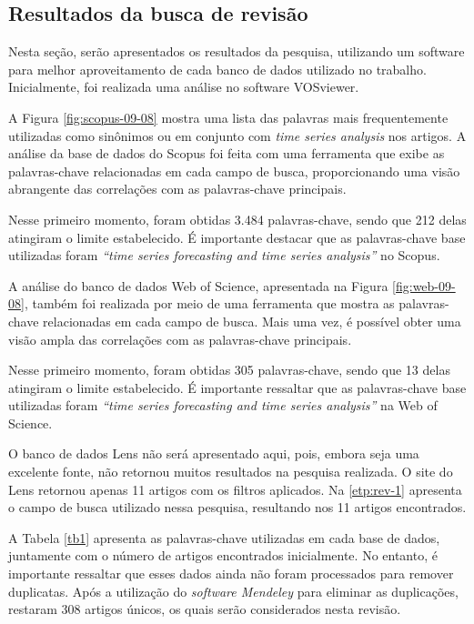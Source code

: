 \subsection{Resultados da busca de revis\~ao}\label{subesec:resul da revisão}


Nesta seção, serão apresentados os resultados da pesquisa, utilizando um software para melhor aproveitamento de cada banco de dados utilizado no trabalho. Inicialmente, foi realizada uma análise no software VOSviewer.



A Figura \ref{fig:scopus-09-08} mostra uma lista das palavras mais frequentemente utilizadas como sinônimos ou em conjunto com \textit{time series analysis} nos artigos. A análise da base de dados do Scopus foi feita com uma ferramenta que exibe as palavras-chave relacionadas em cada campo de busca, proporcionando uma visão abrangente das correlações com as palavras-chave principais.

Nesse primeiro momento, foram obtidas 3.484 palavras-chave, sendo que 212 delas atingiram o limite estabelecido. É importante destacar que as palavras-chave base utilizadas foram \textit{``time series forecasting and time series analysis''} no Scopus.



A análise do banco de dados Web of Science, apresentada na Figura \ref{fig:web-09-08}, também foi realizada por meio de uma ferramenta que mostra as palavras-chave relacionadas em cada campo de busca. Mais uma vez, é possível obter uma visão ampla das correlações com as palavras-chave principais.

Nesse primeiro momento, foram obtidas 305 palavras-chave, sendo que 13 delas atingiram o limite estabelecido. É importante ressaltar que as palavras-chave base utilizadas foram \textit{``time series forecasting and time series analysis''} na Web of Science.

O banco de dados Lens não será apresentado aqui, pois, embora seja uma excelente fonte, não retornou muitos resultados na pesquisa realizada. O site do Lens retornou apenas 11 artigos com os filtros aplicados. Na \ref{etp:rev-1} apresenta o campo de busca utilizado nessa pesquisa, resultando nos 11 artigos encontrados.





A Tabela \ref{tb1} apresenta as palavras-chave utilizadas em cada base de dados, juntamente com o número de artigos encontrados inicialmente. No entanto, é importante ressaltar que esses dados ainda não foram processados para remover duplicatas. Após a utilização do \textit{software Mendeley} para eliminar as duplicações, restaram 308 artigos únicos, os quais serão considerados nesta revisão.


